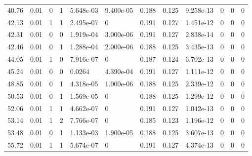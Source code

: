 \documentclass[preview]{standalone}
\begin{document}
{{\begin{tabular}{L{1.2cm}C{1.2cm} C{0.3cm}C{0.5cm} C{1.4cm}C{1.4cm} C{1.4cm}C{1.4cm} C{1.6cm}C{1.6cm} C{1.6cm}C{1.6cm}}
  40.76  &  0.01  & 0     &  1 &  5.648e-03  & 9.400e-05  &  0.188&   0.125& 9.258e-13 & 0   &  0 & 0  \\ 
  42.13  &  0.01  & 1     &  1 &  2.495e-07  & 0  &  0.191&   0.127& 1.451e-12 & 0   &  0 & 0  \\ 
  42.31  &  0.01  & 0     &  0 &  1.919e-04  & 3.000e-06  &  0.191&   0.127& 2.838e-14 & 0   &  0 & 0  \\ 
  42.46  &  0.01  & 0     &  1 &  1.288e-04  & 2.000e-06  &  0.188&   0.125& 3.435e-13 & 0   &  0 & 0  \\ 
  44.05  &  0.01  & 1     &  0 &  7.916e-07  & 0  &  0.187&   0.124& 6.702e-13 & 0   &  0 & 0  \\ 
  45.24  &  0.01  & 0     &  0 &  0.0264  & 4.390e-04  &  0.191&   0.127& 1.111e-12 & 0   &  0 & 0  \\ 
  48.85  &  0.01  & 0     &  1 &  4.318e-05  & 1.000e-06  &  0.188&   0.125& 2.339e-12 & 0   &  0 & 0  \\ 
  50.53  &  0.01  & 0     &  1 &  1.569e-05  & 0  &  0.188&   0.125& 1.299e-12 & 0   &  0 & 0  \\ 
  52.06  &  0.01  & 1     &  1 &  4.662e-07  & 0  &  0.191&   0.127& 1.042e-13 & 0   &  0 & 0  \\ 
  53.14  &  0.01  & 1     &  2 &  7.766e-07  & 0  &  0.185&   0.123& 1.196e-12 & 0   &  0 & 0  \\ 
  53.48  &  0.01  & 0     &  1 &  1.133e-03  & 1.900e-05  &  0.188&   0.125& 3.607e-13 & 0   &  0 & 0  \\ 
  55.72  &  0.01  & 1     &  1 &  5.674e-07  & 0  &  0.191&   0.127& 4.374e-13 & 0   &  0 & 0  \\ 
\hline 
\end{tabular} 

}}
\end{document}
